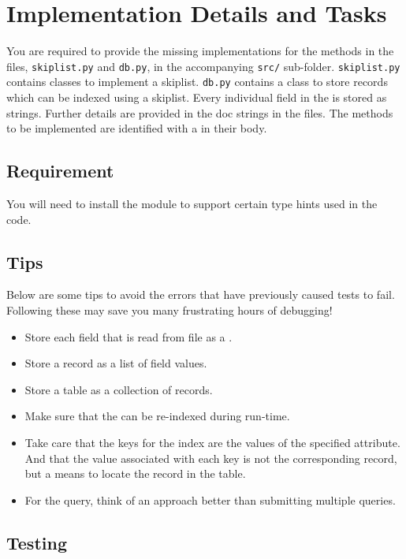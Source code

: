 \documentclass[addpoints]{exam}
\begin{document}
\section{Implementation Details and Tasks}

You are required to provide the missing implementations for the methods in the files, \texttt{skiplist.py} and \texttt{db.py}, in the accompanying \texttt{src/} sub-folder. \texttt{skiplist.py} contains classes to implement a skiplist. \texttt{db.py} contains a  class to store records which can be indexed using a skiplist. Every individual field in the  is stored as strings. Further details are provided in the doc strings in the files. The methods to be implemented are identified with a  in their body.

\subsection{Requirement}

You will need to install the  module to support certain type hints used in the code.

\subsection{Tips}

Below are some tips to avoid the errors that have previously caused tests to fail. Following these may save you many frustrating hours of debugging!
\begin{itemize}
  \item Store each field that is read from file as a .
  \item Store a record as a list of field values.
  \item Store a table as a collection of records.
  \item Make sure that the  can be re-indexed during run-time.
  \item Take care that the keys for the index are the values of the specified attribute. And that the value associated with each key is not the corresponding record, but a means to locate the record in the table.
  \item For the  query, think of an approach better than submitting multiple  queries.
\end{itemize}

\subsection{Testing}
\end{document}
